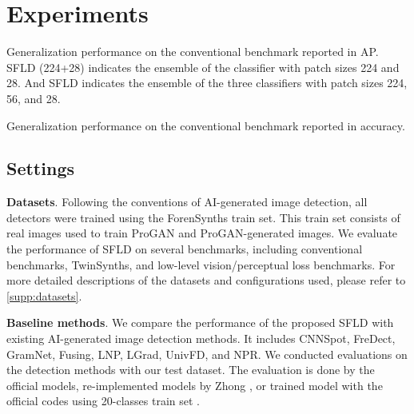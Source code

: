 \section{Experiments}
\label{sec:experiments}

\begin{table*}[ht]
    \centering
    \scriptsize
    \setlength{\tabcolsep}{2pt}
    \resizebox{\textwidth}{!}{
        
    }
    \caption{Generalization performance on the conventional benchmark reported in AP. SFLD (224+28) indicates the ensemble of the classifier with patch sizes 224 and 28. And SFLD indicates the ensemble of the three classifiers with patch sizes 224, 56, and 28.}
    \label{tab:main-results-map}
\end{table*}

\begin{table*}[ht]
    \centering
    \scriptsize
    \setlength{\tabcolsep}{2pt}
    \resizebox{\textwidth}{!}{
        
    }
    \caption{Generalization performance on the conventional benchmark reported in accuracy.}
    \label{tab:main-results-acc}
\end{table*}

\subsection{Settings}
\label{subsec:settings}


\textbf{Datasets}. 
Following the conventions of AI-generated image detection, all detectors were trained using the ForenSynths train set\cite{wang2020cnn}. This train set consists of real images used to train ProGAN\cite{karras2018progressive} and ProGAN-generated images. We evaluate the performance of SFLD on several benchmarks, including conventional benchmarks, TwinSynths, and low-level vision/perceptual loss benchmarks. For more detailed descriptions of the datasets and configurations used, please refer to \cref{supp:datasets}.

\textbf{Baseline methods}. 
We compare the performance of the proposed SFLD with existing AI-generated image detection methods. It includes CNNSpot\cite{wang2020cnn}, FreDect\cite{Frank}, GramNet\cite{liu2020global}, Fusing\cite{ju2022fusing}, LNP\cite{liu2022detecting}, LGrad\cite{Tan2023CVPR}, UnivFD\cite{ojha2023towards}, and NPR\cite{tan2024rethinking}. 
We conducted evaluations on the detection methods with our test dataset. 
The evaluation is done by the official models\cite{wang2020cnn, ojha2023towards}, re-implemented models\cite{Frank, liu2020global, ju2022fusing, liu2022detecting, Tan2023CVPR} by Zhong \etal\cite{rptc-AIGCDetection}, or trained model with the official codes using 20-classes train set \cite{tan2024rethinking}.

